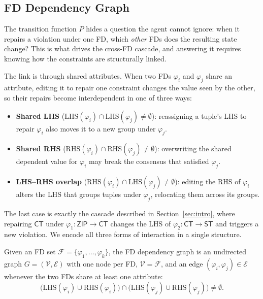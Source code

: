 \documentclass[sigconf]{acmart}
\begin{document}
\subsection{FD Dependency Graph}
\label{sec:FD graph}

The transition function $P$ hides a question the agent cannot ignore: when it repairs a violation under one FD, which \emph{other} FDs does the resulting state change? This is what drives the cross-FD cascade, and answering it requires knowing how the constraints are structurally linked.

The link is through shared attributes. When two FDs $\varphi_i$ and $\varphi_j$ share an attribute, editing it to repair one constraint changes the value seen by the other, so their repairs become interdependent in one of three ways:
\begin{itemize}
    \item \textbf{Shared LHS} ($\text{LHS}(\varphi_i) \cap \text{LHS}(\varphi_j) \neq \emptyset$): reassigning a tuple's LHS to repair $\varphi_i$ also moves it to a new group under $\varphi_j$.
    \item \textbf{Shared RHS} ($\text{RHS}(\varphi_i) \cap \text{RHS}(\varphi_j) \neq \emptyset$): overwriting the shared dependent value for $\varphi_i$ may break the consensus that satisfied $\varphi_j$.
    \item \textbf{LHS--RHS overlap} ($\text{RHS}(\varphi_i) \cap \text{LHS}(\varphi_j) \neq \emptyset$): editing the RHS of $\varphi_i$ alters the LHS that groups tuples under $\varphi_j$, relocating them across its groups.
\end{itemize}
The last case is exactly the cascade described in Section~\ref{sec:intro}, where repairing $\textsf{CT}$ under $\varphi_1: \textsf{ZIP}\rightarrow\textsf{CT}$ changes the LHS of $\varphi_2: \textsf{CT}\rightarrow\textsf{ST}$ and triggers a new violation. We encode all three forms of interaction in a single structure.

\begin{definition}
Given an FD set $\mathcal{F} = \{\varphi_1, \ldots, \varphi_k\}$, the FD dependency graph is an undirected graph $G = (\mathcal{V}, \mathcal{E})$ with one node per FD, $\mathcal{V} = \mathcal{F}$, and an edge $(\varphi_i, \varphi_j) \in \mathcal{E}$ whenever the two FDs share at least one attribute:
\begin{equation}
\big(\text{LHS}(\varphi_i) \cup \text{RHS}(\varphi_i)\big) \cap \big(\text{LHS}(\varphi_j) \cup \text{RHS}(\varphi_j)\big) \neq \emptyset.
\end{equation}
\end{definition}
\end{document}
